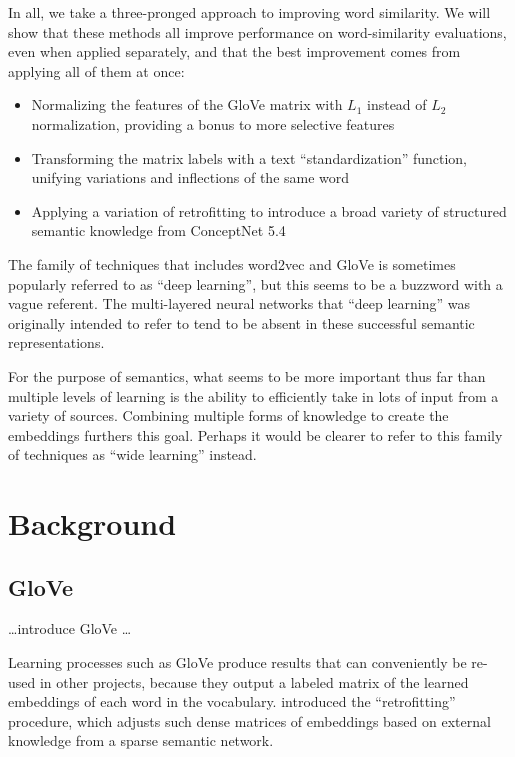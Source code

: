 \documentclass[letterpaper]{article}
\begin{document}
In all, we take a three-pronged approach to improving word similarity. We will
show that these methods all improve performance on word-similarity evaluations,
even when applied separately, and that the best improvement comes from applying
all of them at once:

\begin{itemize}
\item Normalizing the features of the GloVe matrix with $L_1$ instead of $L_2$
    normalization, providing a bonus to more selective features
\item Transforming the matrix labels with a text ``standardization'' function,
    unifying variations and inflections of the same word
\item Applying a variation of retrofitting to introduce a broad variety of
    structured semantic knowledge from ConceptNet 5.4
\end{itemize}

The family of techniques that includes word2vec and GloVe is sometimes popularly
referred to as ``deep learning'', but this seems to be a buzzword with a vague
referent. The multi-layered neural networks that ``deep learning'' was
originally intended to refer to \cite{hinton2006deep} tend to be absent in these
successful semantic representations.

For the purpose of semantics, what seems to be more important thus far than
multiple levels of learning is the ability to efficiently take in lots of input
from a variety of sources. Combining multiple forms of knowledge to create the
embeddings furthers this goal. Perhaps it would be clearer to refer to this
family of techniques as ``wide learning'' instead.

\section{Background}

\subsection{GloVe}
\ldots introduce GloVe \ldots %

Learning processes such as GloVe produce results that can conveniently be
re-used in other projects, because they output a labeled matrix of the learned
embeddings of each word in the vocabulary.
introduced the ``retrofitting'' procedure, which adjusts such dense matrices of
embeddings based on external knowledge from a sparse semantic network.
\end{document}
